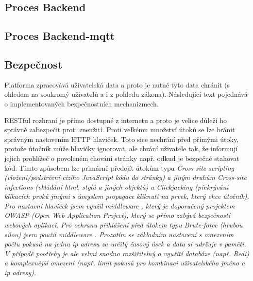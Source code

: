 \subsection{Proces Backend}

\subsection{Proces Backend-mqtt}

\subsection{Bezpečnost}
Platforma zpracovává uživatelská data a proto je nutné tyto data chránit (s ohledem na soukromý uživatelů a i z pohledu zákona). Následující text pojednává o implementovaných bezpečnostních mechanizmech.

RESTful rozhraní je přímo dostupné z internetu a proto je velice důleží ho správně zabezpečit proti zneužití. Proti velkému množství útoků se lze bránit správným nastavením HTTP hlaviček. Toto sice nechrání před přímými útoky, protože útočník může hlavičky ignorovat, ale chrání uživatele tak, že informují jejich prohlížeč o povoleném chování stránky např. odkud je bezpečné stahovat kód. Tímto způsobem lze primárně předejít útokům typu \itshape{Cross-site scripting} (vložení/podstrčení cizího JavaScript kódu do stránky) a jiným druhům \itshape{Cross-site infections} (vkládání html, stylů a jiných objektů) a \itshape{Clickjacking} (překrývání klikacích prvků jinými s úmyslem propagace kliknutí na prvek, který chce útočník). Pro nastavní hlaviček jsem využil middleware , který je doporučený projektem OWASP (Open Web Application Project), který se přímo zabývá bezpečností webových aplikací. Pro ochranu přihlášení před útokem typu \itshape{Brute-force} (hrubou silou) jsem použil middleware . Prozatím se základním nastavení s omezením počtu pokusů na jednu ip adresu za určitý časový úsek a data si udržuje v paměti. V případě pootřeby je ale velmi snadno rozšiřitelný o využití databáze (např. Redi) a komplexnější omezení (např. limit pokusů pro kombinaci uživatelského jméno a ip adresy).

